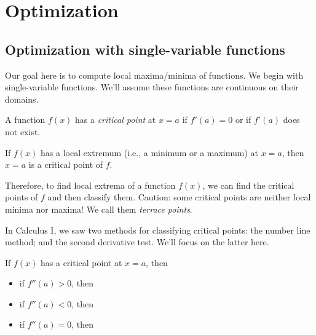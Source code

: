 \newlecture

\setcounter{section}{6}
\def\coursetopicnumber{II}
\def\topic{Optimization} %
\def\shorttopic{Optimization} %
\def\textbookname{Active Calculus} %
\def\shorttextbookname{AC} %
\def\textbooksection{10.7} %
\def\textbooksectionurl{https://activecalculus.org/vector/S-10-7-Optimization.html} %
\def\handoutday{} %

\thispagestyle{plain}
\topstuff


\section{\topic{} \booklink{}}
\label{sec:optimization}
\subsection{Optimization with single-variable functions}

Our goal here is to compute local maxima/minima of functions. We begin with single-variable functions. We'll assume these functions are continuous on their domains.

\begin{defn}
    A function $f(x)$ has a \emph{critical point} at $x=a$ if $f'(a)=0$ or if $f'(a)$ does not exist.
\end{defn}%

\begin{prop}
    If $f(x)$ has a local extremum (i.e., a minimum or a maximum) at $x=a$, then $x=a$ is a critical point of $f$.
\end{prop}

Therefore, to find local extrema of a function $f(x)$, we can find the critical points of $f$ and then classify them. Caution: some critical points are neither local minima nor maxima! We call them \emph{terrace points}.

In Calculus I, we saw two methods for classifying critical points: the number line method; and the second derivative test. We'll focus on the latter here.
\begin{prop}
    If $f(x)$ has a critical point at $x=a$, then
    \begin{itemize}
        \item if $f''(a)>0$, then %
        \bigskip
        \item if $f''(a)<0$, then %
        \bigskip
        \item if $f''(a)=0$, then %
        \bigskip
    \end{itemize}
\end{prop}
\bigskip 

